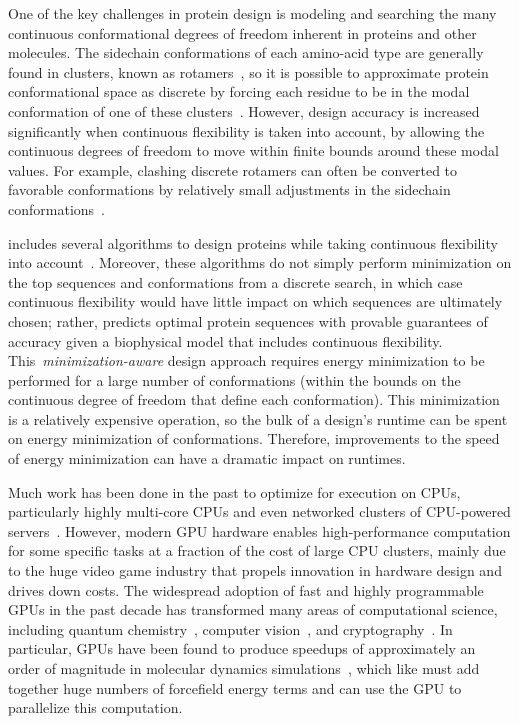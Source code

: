One of the key challenges in protein design is modeling and searching the many continuous conformational degrees of freedom inherent in proteins and other molecules. The sidechain conformations of each amino-acid type are generally found in clusters, known as rotamers~\cite{rotamers}, so it is possible to approximate protein conformational space as discrete by forcing each residue to be in the modal conformation of one of these clusters~\cite{DEE,DEE/A*}.  However, design accuracy is increased significantly when continuous flexibility is taken into account, by allowing the continuous degrees of freedom to move within finite bounds around these modal values.  For example, clashing discrete rotamers can often be converted to favorable conformations by relatively small adjustments in the sidechain conformations~\cite{minDEE,iMinDEE,DEEPer,CATS}.  

\osprey includes several algorithms to design proteins while taking continuous flexibility into account~\cite{minDEE,iMinDEE,DEEPer,EPIC,LUTE_RECOMB,CATS}.  Moreover, these algorithms do not simply perform minimization on the top sequences and conformations from a discrete search, in which case continuous flexibility would have little impact on which sequences are ultimately chosen; rather, \osprey predicts optimal protein sequences with provable guarantees of accuracy given a biophysical model that includes continuous flexibility.  This~\textit{minimization-aware} design approach requires energy minimization to be performed for a large number of conformations (within the bounds on the continuous degree of freedom that define each conformation).  This minimization is a relatively expensive operation, so the bulk of a design's runtime can be spent on energy minimization of conformations. Therefore, improvements to the speed of energy minimization can have a dramatic impact on \osprey runtimes.  

Much work has been done in the past to optimize \osprey for execution on CPUs, particularly highly multi-core CPUs and even networked clusters of CPU-powered servers~\cite{minBounds_DACS,cloud_OSPREY}. However, modern GPU hardware enables high-performance computation for some specific tasks at a fraction of the cost of large CPU clusters, mainly due to the huge video game industry that propels innovation in hardware design and drives down costs. The widespread adoption of fast and highly programmable GPUs in the past decade has transformed many areas of computational science, including quantum chemistry~\cite{GPU_QM}, computer vision~\cite{ResNet}, and cryptography~\cite{GPU_crypto}.  In particular, GPUs have been found to produce speedups of approximately an order of magnitude in molecular dynamics simulations~\cite{HOOMD_GPU,AMBER_GPU_microseconds,GROMACS_GPU}, which like \osprey must add together huge numbers of forcefield energy terms and can use the GPU to parallelize this computation.  

